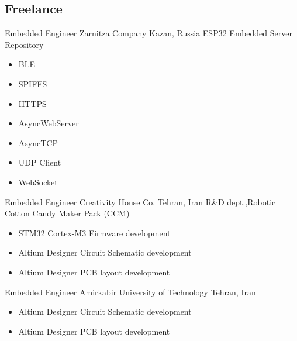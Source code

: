 \vspace{2mm}
\subsection{\Large{Freelance}}

        {Embedded Engineer}
        {\href{https://zarnitza.ru/}{\color{blue}Zarnitza Company}}
        {Kazan, Russia}
        {
        \newline
        \href{https://github.com/Ehsan2754/embedded-server}{\color{blue}ESP32 Embedded Server Repository}
        } 
        {
        \begin{itemize}
            \item  BLE
            \item SPIFFS
            \item HTTPS 
            \item AsyncWebServer
            \item AsyncTCP 
            \item UDP Client
            \item WebSocket
        \end{itemize}
        }
        
	{Embedded Engineer}
	{\href{https://www.instagram.com/creativityhouse.ir/}{\color{blue}Creativity House Co.}}
        {Tehran, Iran}
	{
         \newline
         R\&D dept.,Robotic Cotton Candy Maker Pack (CCM) }
         {
         \begin{itemize}
            \item STM32 Cortex-M3 Firmware development
            \item Altium Designer Circuit Schematic development
            \item Altium Designer  PCB layout development
         \end{itemize}
         }


    {Embedded Engineer}
    {Amirkabir University of Technology}
    {Tehran, Iran}
    {
    \newline
    \href{https://phee.aut.ac.ir/en}{\color{blue}{Physics and Energy Faculty}}}
    {
    \begin{itemize}
        \item Altium Designer Circuit Schematic development
        \item Altium Designer  PCB layout development
    \end{itemize}
     }
     
